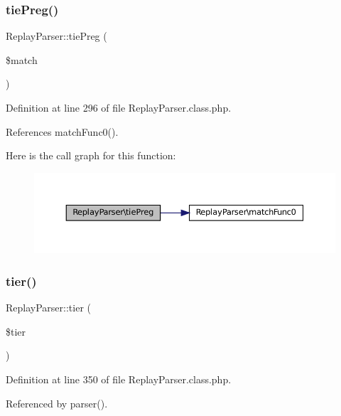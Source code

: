 \subsubsection{\texorpdfstring{tie\+Preg()}{tiePreg()}}
{\footnotesize\ttfamily Replay\+Parser\+::tie\+Preg (\begin{DoxyParamCaption}\item[{}]{\$match }\end{DoxyParamCaption})}



Definition at line 296 of file Replay\+Parser.\+class.\+php.



References match\+Func0().

Here is the call graph for this function\+:\nopagebreak
\begin{figure}[H]
\begin{center}
\leavevmode
\includegraphics[width=350pt]{class_replay_parser_a44e81699ecad590f46d29a99ece30a2e_cgraph}
\end{center}
\end{figure}
\mbox{\label{class_replay_parser_af5dd7c479acbd2646fe9d8ed37e74e79}} 
\subsubsection{\texorpdfstring{tier()}{tier()}}
{\footnotesize\ttfamily Replay\+Parser\+::tier (\begin{DoxyParamCaption}\item[{}]{\$tier }\end{DoxyParamCaption})}



Definition at line 350 of file Replay\+Parser.\+class.\+php.



Referenced by parser().

